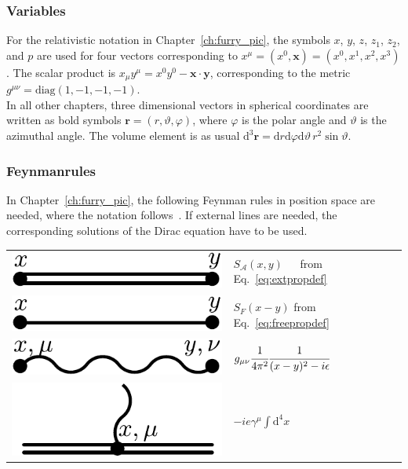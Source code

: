 \subsubsection*{Variables}
For the relativistic notation in Chapter~\ref{ch:furry_pic}, the symbols $x$, $y$, $z$, $z_1$, $z_2$, and $p$ are used for four vectors corresponding to $x^\mu=(x^0,\mathbf{x})=(x^0,x^1,x^2,x^3)$. The scalar product is $x_\mu y^\mu = x^0 y^0 - \mathbf{x}\cdot\mathbf{y}$, corresponding to the metric $g^{\mu\nu}=\text{diag}(1,-1,-1,-1)$.\\
In all other chapters, three dimensional vectors in spherical coordinates are written as bold symbols $\mathbf{r}=(r,\vartheta,\varphi)$, where $\varphi$ is the polar angle and $\vartheta$ is the azimuthal angle. The volume element is as usual $\text{d}^3\mathbf{r}=\text{d}r\text{d}\varphi\text{d}\vartheta\, r^2 \sin\vartheta $.
\subsubsection*{Feynmanrules}
In Chapter~\ref{ch:furry_pic}, the following Feynman rules in position space are needed, where the notation follows~\cite{itzykson2005}. If external lines are needed, the corresponding solutions of the Dirac equation have to be used.\\

\begin{tabular}{ll}
\includegraphics[width=0.2\linewidth]{pics/feynrule_1.pdf} & $S_{\mathcal{A}}(x,y)\phantom{-}$ from Eq.~\eqref{eq:extpropdef}\\[7pt]
\includegraphics[width=0.2\linewidth]{pics/feynrule_2.pdf} &$S_{F}(x-y)$ from Eq.~\eqref{eq:freepropdef}\\[7pt]
\includegraphics[width=0.2\linewidth]{pics/feynrule_3.pdf} &$g_{\mu\nu}\cfrac{1}{4\pi^2}\cfrac{1}{(x-y)^2-i\epsilon}$\\[7pt]
\includegraphics[width=0.2\linewidth]{pics/feynrule_4.pdf} &$-ie\gamma^\mu\int\text{d}^4x$
\end{tabular}

